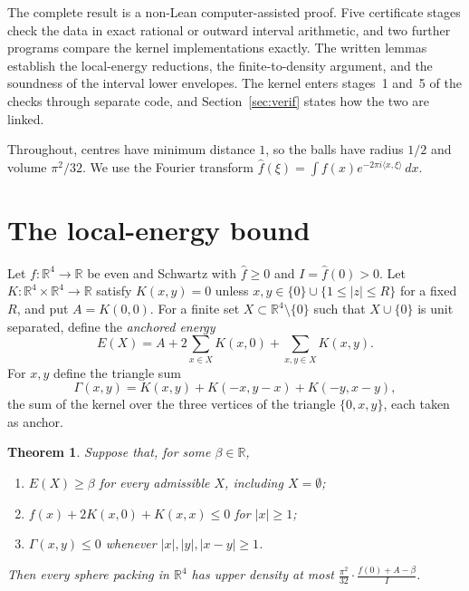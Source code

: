 \documentclass[11pt]{amsart}
\numberwithin{equation}{section}
\newtheorem{theorem}{Theorem}[section]
\theoremstyle{remark}
\newcommand{\R}{\mathbb{R}}
\newcommand{\ip}[2]{\langle #1,#2\rangle}
\newcommand{\Gam}{\Gamma}
\begin{document}
The complete result is a non-Lean computer-assisted proof. Five certificate stages check the data in exact rational or outward interval arithmetic, and two further programs compare the kernel implementations exactly. The written lemmas establish the local-energy reductions, the finite-to-density argument, and the soundness of the interval lower envelopes. The kernel enters stages~1 and~5 of the checks through separate code, and Section~\ref{sec:verif} states how the two are linked.

Throughout, centres have minimum distance $1$, so the balls have radius $1/2$ and volume $\pi^2/32$. We use the Fourier transform $\hat f(\xi)=\int f(x)e^{-2\pi i\ip x\xi}\,dx$.

\section{The local-energy bound}\label{sec:local}

Let $f\colon\R^4\to\R$ be even and Schwartz with $\hat f\ge0$ and $I=\hat f(0)>0$. Let $K\colon\R^4\times\R^4\to\R$ satisfy $K(x,y)=0$ unless $x,y\in\{0\}\cup\{1\le|z|\le R\}$ for a fixed $R$, and put $A=K(0,0)$. For a finite set $X\subset\R^4\setminus\{0\}$ such that $X\cup\{0\}$ is unit separated, define the \emph{anchored energy}
\[
E(X)=A+2\sum_{x\in X}K(x,0)+\sum_{x,y\in X}K(x,y).
\]
For $x,y$ define the triangle sum
\[
\Gam(x,y)=K(x,y)+K(-x,y-x)+K(-y,x-y),
\]
the sum of the kernel over the three vertices of the triangle $\{0,x,y\}$, each taken as anchor.

\begin{theorem}\label{thm:local}
Suppose that, for some $\beta\in\R$,
\begin{enumerate}
\item $E(X)\ge\beta$ for every admissible $X$, including $X=\emptyset$;
\item $f(x)+2K(x,0)+K(x,x)\le0$ for $|x|\ge1$;
\item $\Gam(x,y)\le0$ whenever $|x|,|y|,|x-y|\ge1$.
\end{enumerate}
Then every sphere packing in $\R^4$ has upper density at most $\frac{\pi^2}{32}\cdot\frac{f(0)+A-\beta}{I}$.
\end{theorem}
\end{document}
